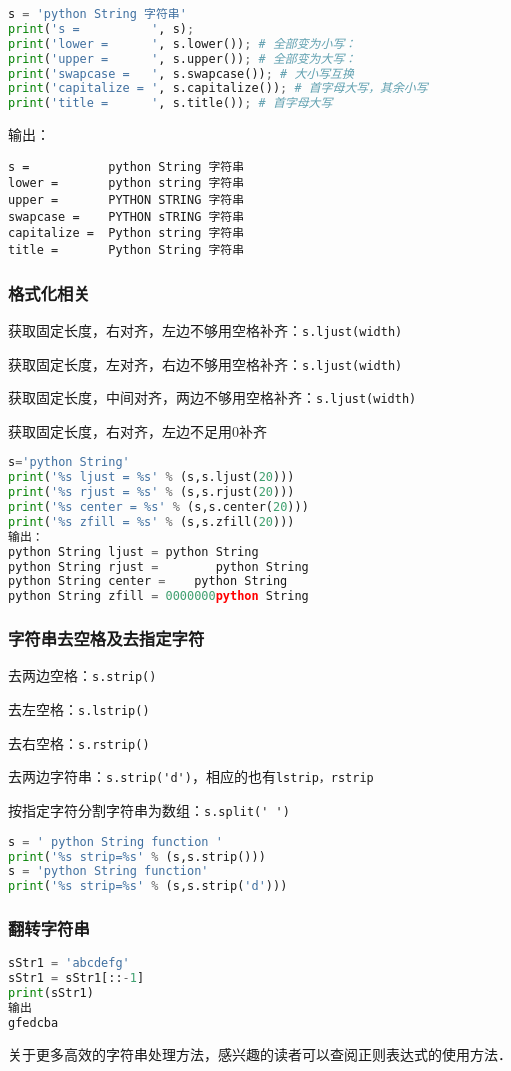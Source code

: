 \begin{lstlisting}[language=python]
s = 'python String 字符串'
print('s =          ', s);
print('lower =      ', s.lower()); # 全部变为小写：
print('upper =      ', s.upper()); # 全部变为大写：
print('swapcase =   ', s.swapcase()); # 大小写互换
print('capitalize = ', s.capitalize()); # 首字母大写，其余小写
print('title =      ', s.title()); # 首字母大写
\end{lstlisting}
输出：
\begin{lstlisting}
s =           python String 字符串
lower =       python string 字符串
upper =       PYTHON STRING 字符串
swapcase =    PYTHON sTRING 字符串
capitalize =  Python string 字符串
title =       Python String 字符串
\end{lstlisting}

\subsubsection{格式化相关}
获取固定长度，右对齐，左边不够用空格补齐：\verb|s.ljust(width)|

获取固定长度，左对齐，右边不够用空格补齐：\verb|s.ljust(width)|

获取固定长度，中间对齐，两边不够用空格补齐：\verb|s.ljust(width)|

获取固定长度，右对齐，左边不足用0补齐

\begin{lstlisting}[language=python]
s='python String'
print('%s ljust = %s' % (s,s.ljust(20)))
print('%s rjust = %s' % (s,s.rjust(20)))
print('%s center = %s' % (s,s.center(20)))
print('%s zfill = %s' % (s,s.zfill(20)))
输出：
python String ljust = python String       
python String rjust =        python String
python String center =    python String    
python String zfill = 0000000python String
\end{lstlisting}

\subsubsection{字符串去空格及去指定字符}

去两边空格：\verb|s.strip()|

去左空格：\verb|s.lstrip()|

去右空格：\verb|s.rstrip()|

去两边字符串：\verb|s.strip('d')|，相应的也有\verb|lstrip，rstrip|

按指定字符分割字符串为数组：\verb|s.split(' ')|

\begin{lstlisting}[language=python]
s = ' python String function '
print('%s strip=%s' % (s,s.strip()))
s = 'python String function'
print('%s strip=%s' % (s,s.strip('d')))
\end{lstlisting}

\subsubsection{翻转字符串}
\begin{lstlisting}[language=python]
sStr1 = 'abcdefg'
sStr1 = sStr1[::-1]
print(sStr1)
输出
gfedcba
\end{lstlisting}

关于更多高效的字符串处理方法，感兴趣的读者可以查阅正则表达式的使用方法．

